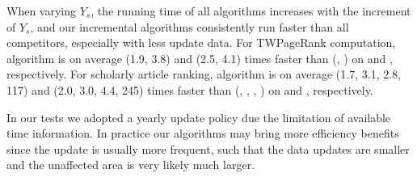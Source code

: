 When varying $Y_s$, the running time of all algorithms increases with the increment of $Y_s$, and our incremental algorithms
consistently run faster than all competitors, especially with less update data.
%
For TWPageRank computation, algorithm \inctwprscc is on average (1.9, 3.8) and (2.5, 4.1) times faster than (\twprscc, \powtwprscc) on \aminer and \magdata, respectively.
%
For scholarly article ranking, algorithm \incensemble is on average (1.7, 3.1, 2.8, 117) and (2.0, 3.0, 4.4, 245) times faster than (\batensemble, \powensemble, \futurerank, \hhgrank) on \aminer and \magdata, respectively.


In our tests we adopted a yearly update policy due the limitation of  available time information. In practice our algorithms may bring more efficiency benefits since the update is usually more frequent, such that the data updates are smaller and the unaffected area is very likely much larger.




